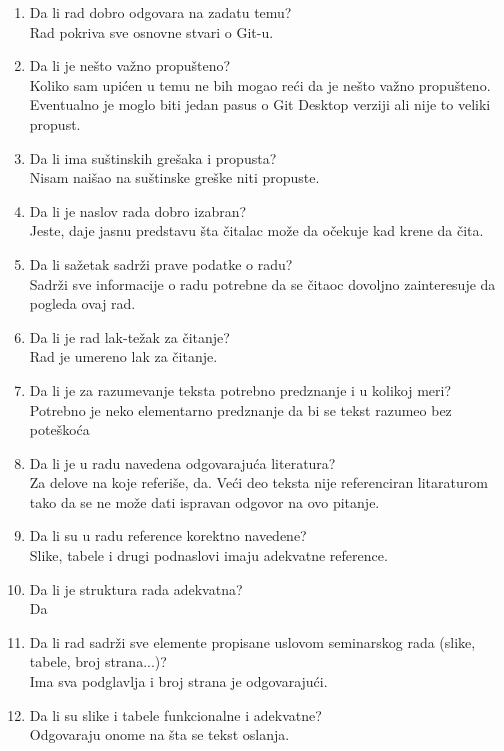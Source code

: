 \documentclass[a4paper]{report}
\begin{document}
\begin{enumerate}
\item Da li rad dobro odgovara na zadatu temu?\\
Rad pokriva sve osnovne stvari o Git-u.
\item Da li je nešto važno propušteno?\\
Koliko sam upićen u temu ne bih mogao reći da je nešto važno propušteno. Eventualno je moglo biti jedan pasus o Git Desktop verziji ali nije to veliki propust.
\item Da li ima suštinskih grešaka i propusta?\\
Nisam naišao na suštinske greške niti propuste.
\item Da li je naslov rada dobro izabran?\\
Jeste, daje jasnu predstavu šta čitalac može da očekuje kad krene da čita.
\item Da li sažetak sadrži prave podatke o radu?\\
Sadrži sve informacije o radu potrebne da se čitaoc dovoljno zainteresuje da pogleda ovaj rad.
\item Da li je rad lak-težak za čitanje?\\
Rad je umereno lak za čitanje.
\item Da li je za razumevanje teksta potrebno predznanje i u kolikoj meri?\\
Potrebno je neko elementarno predznanje da bi se tekst razumeo bez poteškoća
\item Da li je u radu navedena odgovarajuća literatura?\\
Za delove na koje referiše, da. Veći deo teksta nije referenciran litaraturom tako da se ne može dati ispravan odgovor na ovo pitanje.
\item Da li su u radu reference korektno navedene?\\
Slike, tabele i drugi podnaslovi imaju adekvatne reference.
\item Da li je struktura rada adekvatna?\\
Da
\item Da li rad sadrži sve elemente propisane uslovom seminarskog rada (slike, tabele, broj strana...)?\\
Ima sva podglavlja i broj strana je odgovarajući.
\item Da li su slike i tabele funkcionalne i adekvatne?\\
Odgovaraju onome na šta se tekst oslanja.
\end{enumerate}
\end{document}

